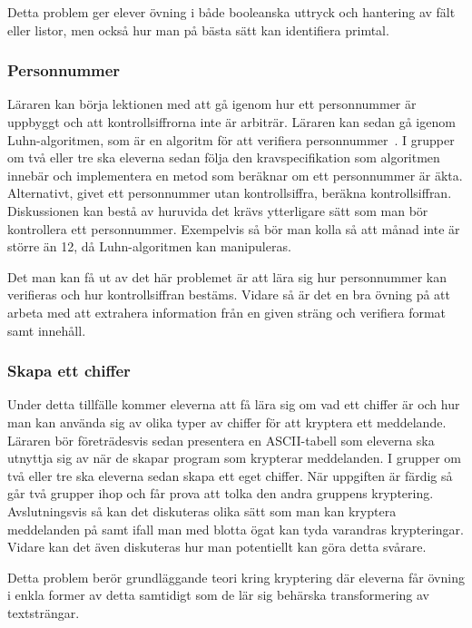     \textcolor{WildStrawberry}{
        Detta problem ger elever övning i både booleanska uttryck och hantering av fält eller listor, men också hur man på bästa sätt kan identifiera primtal.
        }

\subsubsection{Personnummer}
    \label{sec:Personnummer}
    
    \textcolor{WildStrawberry}{
        Läraren kan börja lektionen med att gå igenom hur ett personnummer är uppbyggt och att kontrollsiffrorna inte är arbiträr. Läraren kan sedan gå igenom Luhn-algoritmen, som är en algoritm för att verifiera personnummer~\cite{Luhn}. I grupper om två eller tre ska eleverna sedan följa den kravspecifikation som algoritmen innebär och implementera en metod som beräknar om ett personnummer är äkta. Alternativt, givet ett personnummer utan kontrollsiffra, beräkna kontrollsiffran. Diskussionen kan bestå av huruvida det krävs ytterligare sätt som man bör kontrollera ett personnummer. Exempelvis så bör man kolla så att månad inte är större än 12, då Luhn-algoritmen kan manipuleras.}
        
    \textcolor{WildStrawberry}{
        Det man kan få ut av det här problemet är att lära sig hur personnummer kan verifieras och hur kontrollsiffran bestäms. Vidare så är det en bra övning på att arbeta med att extrahera information från en given sträng och verifiera format samt innehåll.
        }

\subsubsection{Skapa ett chiffer}
    \label{sec:chiffer}
    
    \textcolor{WildStrawberry}{
        Under detta tillfälle kommer eleverna att få lära sig om vad ett chiffer är och hur man kan använda sig av olika typer av chiffer för att kryptera ett meddelande. Läraren bör företrädesvis sedan presentera en ASCII-tabell som eleverna ska utnyttja sig av när de skapar program som krypterar meddelanden. I grupper om två eller tre ska eleverna sedan skapa ett eget chiffer. När uppgiften är färdig så går två grupper ihop och får prova att tolka den andra gruppens kryptering. Avslutningsvis så kan det diskuteras olika sätt som man kan kryptera meddelanden på samt ifall man med blotta ögat kan tyda varandras krypteringar. Vidare kan det även diskuteras hur man potentiellt kan göra detta svårare.}
        
    \textcolor{WildStrawberry}{
        Detta problem berör grundläggande teori kring kryptering där eleverna får övning i enkla former av detta samtidigt som de lär sig behärska transformering av textsträngar.
        }